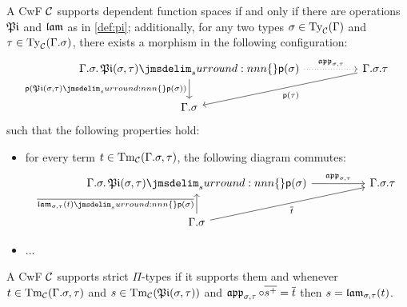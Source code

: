 \documentclass[a4paper]{article}
\begin{document}
\begin{proposition}
  A CwF $\mathcal{C}$ supports dependent function spaces if and only if there are operations $\operatorname{\mathfrak{Pi}}$ and $\operatorname{\mathfrak{lam}}$ as in \cref{def:pi}; additionally, for any two types $\sigma \in \operatorname{Ty}_{\mathcal{C}}(\Gamma)$ and $\tau \in \operatorname{Ty}_{\mathcal{C}}(\Gamma.\sigma)$, there exists a morphism in the following configuration:
  \[\begin{tikzcd}
      {\Gamma.\sigma.\semSubst{\typePi(\sigma,\tau)}{\ctxExt(\sigma)}} && {\Gamma.\sigma.\tau} \\
      {\Gamma.\sigma}
      \arrow["{\app_{\sigma,\tau}}", dotted, from=1-1, to=1-3]
      \arrow["{\ctxExt(\semSubst{\typePi(\sigma,\tau)}{\ctxExt(\sigma)})}"', from=1-1, to=2-1]
      \arrow["{\ctxExt(\tau)}", from=1-3, to=2-1]
    \end{tikzcd}\]
  such that the following properties hold:
  \begin{itemize}
  \item for every term $t \in \operatorname{Tm}_{\mathcal{C}}(\Gamma.\sigma,\tau)$, the following diagram commutes:
    \[\begin{tikzcd}
	{\Gamma.\sigma.\semSubst{\typePi(\sigma,\tau)}{\ctxExt(\sigma)}} && {\Gamma.\sigma.\tau} \\
	{\Gamma.\sigma}
	\arrow["{\app_{\sigma,\tau}}", from=1-1, to=1-3]
	\arrow["{\ctxSec{\semSubst{\lam_{\sigma,\tau}(t)}{\ctxExt(\sigma)}}}", from=2-1, to=1-1]
	\arrow["{\ctxSec{t}}"', from=2-1, to=1-3]
      \end{tikzcd}\]
  \item ...
  \end{itemize}
\end{proposition}



\begin{definition}
  A CwF $\mathcal{C}$ supports strict $\Pi$-types if it supports them and whenever $t \in \operatorname{Tm}_{\mathcal{C}}(\Gamma.\sigma,\tau)$ and $s \in \operatorname{Tm}_{\mathcal{C}}(\operatorname{\mathfrak{Pi}}(\sigma,\tau))$ and $\operatorname{\mathfrak{app}}_{\sigma,\tau} \circ \overline{s^+} = \overline{t}$ then $s = \operatorname{\mathfrak{lam}}_{\sigma,\tau}(t)$.
\end{definition}
\end{document}
